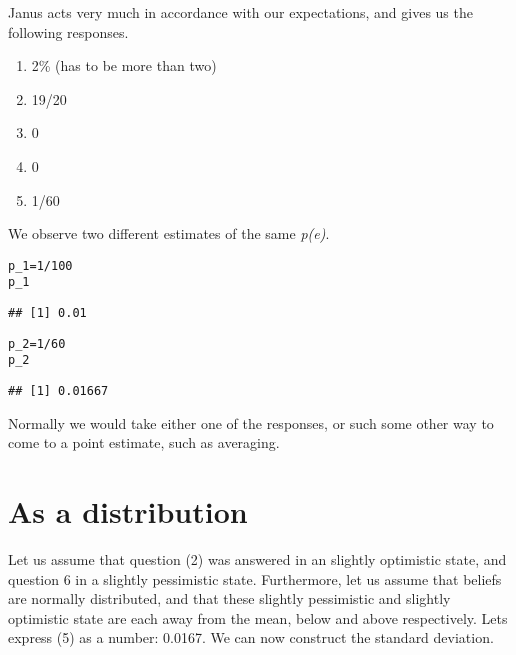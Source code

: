 \documentclass[a4paper]{book}\usepackage{graphicx, color}
\makeatletter
\newenvironment{kframe}{%
 \def\at@end@of@kframe{}%
 \ifinner\ifhmode%
  \def\at@end@of@kframe{\end{minipage}}%
  \begin{minipage}{\columnwidth}%
 \fi\fi%
 \def\FrameCommand##1{\hskip\@totalleftmargin \hskip-\fboxsep
 \colorbox{shadecolor}{##1}\hskip-\fboxsep
     \hskip-\linewidth \hskip-\@totalleftmargin \hskip\columnwidth}%
 \MakeFramed {\advance\hsize-\width
   \@totalleftmargin\z@ \linewidth\hsize
   \@setminipage}}%
 {\par\unskip\endMakeFramed%
 \at@end@of@kframe}
\newenvironment{knitrout}{}{} %
\makeatother
\begin{document}
Janus acts very much in accordance with our expectations, and gives us
the following responses.

\begin{enumerate}
\def\labelenumi{\arabic{enumi}.}
\itemsep1pt\parskip0pt
\item
  2\% (has to be more than two)
\item
  19/20
\item
  0
\item
  0
\item
  1/60
\end{enumerate}

We observe two different estimates of the same \emph{p(e)}.

\begin{knitrout}
\color{fgcolor}\begin{kframe}
\begin{alltt}
p_1 = 1/100
p_1
\end{alltt}
\begin{verbatim}
## [1] 0.01
\end{verbatim}
\end{kframe}
\end{knitrout}


\begin{knitrout}
\color{fgcolor}\begin{kframe}
\begin{alltt}
p_2 = 1/60
p_2
\end{alltt}
\begin{verbatim}
## [1] 0.01667
\end{verbatim}
\end{kframe}
\end{knitrout}



Normally we would take either one of the responses, or such some other
way to come to a point estimate, such as averaging.

\section{As a distribution}

Let us assume that question (2) was answered in an slightly optimistic
state, and question 6 in a slightly pessimistic state. Furthermore, let
us assume that beliefs are normally distributed, and that these slightly
pessimistic and slightly optimistic state are each away from the mean,
below and above respectively. Lets express (5) as a number: 0.0167. We
can now construct the standard deviation.
\end{document}

